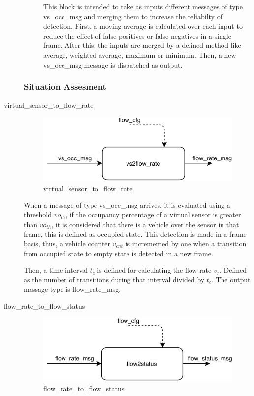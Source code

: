 \begin{description}
\begin{description}
This block is intended to take as inputs different messages of type vs\_occ\_msg and merging them to increase the reliabilty of detection. First, a moving average is calculated over each input to reduce the effect of false positives or false negatives in a single frame. After this, the inputs are merged by a defined method like average, weighted average, maximum or minimum. Then, a new vs\_occ\_msg message is dispatched as output.

\end{description}


\subsubsection{Situation Assesment}

\item[virtual\_sensor\_to\_flow\_rate] \hfill
\begin{figure}[ht!]
\centering
\includegraphics[scale=1]{fig/3/vs2flow.pdf}
\caption{virtual\_sensor\_to\_flow\_rate}
\label{virtual_sensor_to_flow_status}
\end{figure}

When a message of type vs\_occ\_msg arrives, it is evaluated using a threshold $vo_{th}$, if the occupancy percentage of a virtual sensor is greater than $vo_{th}$, it is considered that there is a vehicle over the sensor in that frame, this is defined as occupied state. This detection is made in a frame basis, thus, a vehicle counter $v_{cnt}$ is incremented by one when a transition from occupied state to empty state is detected in a new frame.

Then, a time interval $t_{c}$ is defined for calculating the flow rate $v_{r}$. Defined as the number of transitions during that interval divided by $t_{c}$. The output message type is flow\_rate\_msg.

\item[flow\_rate\_to\_flow\_status] \hfill
\begin{figure}[ht!]
\centering
\includegraphics[scale=1]{fig/3/flow2status.pdf}
\caption{flow\_rate\_to\_flow\_status}
\label{flow_rate_to_flow_status}
\end{figure}



\end{description}

